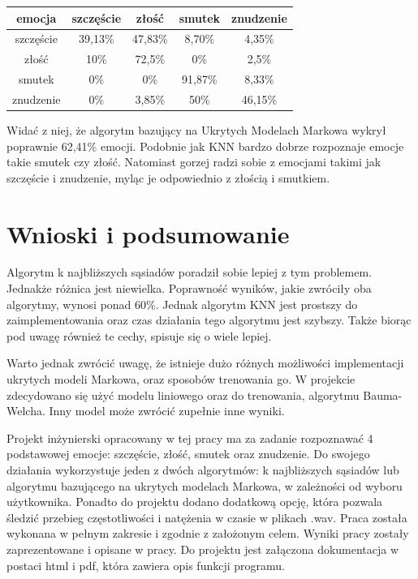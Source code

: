 \documentclass[declaration,shortabstract]{iithesis}
\begin{document}
\begin{center}
  \begin{tabular}{| c | c | c | c | c |}
    \hline
    emocja & szczęście & złość & smutek & znudzenie \\ \hline
    szczęście & 39,13\% & 47,83\% & 8,70\% & 4,35\% \\ \hline
	złość & 10\% & 72,5\% & 0\% & 2,5\% \\ \hline
	smutek & 0\% & 0\% & 91,87\% & 8,33\% \\ \hline
	znudzenie & 0\% & 3,85\% & 50\% & 46,15\% \\
    \hline
  \end{tabular}
\end{center}

Widać z niej, że algorytm bazujący na Ukrytych Modelach Markowa wykrył poprawnie 62,41\% emocji. Podobnie jak KNN bardzo dobrze rozpoznaje emocje takie smutek czy złość. Natomiast gorzej radzi sobie z emocjami takimi jak szczęście i znudzenie, myląc je odpowiednio z złością i smutkiem.

\chapter{Wnioski i podsumowanie}

Algorytm k najbliższych sąsiadów poradził sobie lepiej z tym problemem. Jednakże różnica jest niewielka. Poprawność wyników, jakie zwróciły oba algorytmy, wynosi ponad 60\%. Jednak algorytm KNN jest prostszy do zaimplementowania oraz czas działania tego algorytmu jest szybszy. Także biorąc pod uwagę również te cechy, spisuje się o wiele lepiej.

Warto jednak zwrócić uwagę, że istnieje dużo różnych możliwości implementacji ukrytych modeli Markowa, oraz sposobów trenowania go. W projekcie zdecydowano się użyć modelu liniowego oraz do trenowania, algorytmu Bauma-Welcha. Inny model może zwrócić zupełnie inne wyniki.

Projekt inżynierski opracowany w tej pracy ma za zadanie rozpoznawać 4 podstawowej emocje: szczęście, złość, smutek oraz znudzenie. Do swojego działania wykorzystuje jeden z dwóch algorytmów: k najbliższych sąsiadów lub algorytmu bazującego na ukrytych modelach Markowa, w zależności od wyboru użytkownika. Ponadto do projektu dodano dodatkową opcję, która pozwala śledzić przebieg częstotliwości i natężenia w czasie w plikach .wav. Praca została wykonana w pełnym zakresie i zgodnie z założonym celem. Wyniki pracy zostały zaprezentowane i opisane w pracy. Do projektu jest załączona dokumentacja w postaci html i pdf, która zawiera opis funkcji programu.
\end{document}
